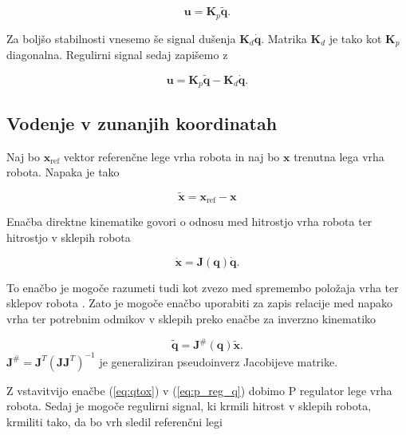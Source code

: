 \documentclass[a4paper]{article}
\begin{document}
\begin{equation} \label{eq:p_reg_q}
\textbf{u} = \textbf{K}_p  \tilde{\textbf{q}}.
\end{equation}


Za boljšo stabilnosti vnesemo še signal dušenja $\textbf{K}_d \dot{\mathbf{q}}$. Matrika $\textbf{K}_d$ je tako kot $\textbf{K}_p$ diagonalna. Regulirni signal sedaj zapišemo z

\begin{equation} \label{eq:pd_reg_q}
\textbf{u} = \textbf{K}_p \tilde{\mathbf{q}} - \textbf{K}_d \dot{\mathbf{q}}.
\end{equation}

\subsection{Vodenje v zunanjih koordinatah} \label{sec:admit_out}

Naj bo $\textbf{x}_{\mathrm{ref}}$ vektor referenčne lege vrha robota in naj bo $\textbf{x}$ trenutna lega vrha robota. Napaka je tako

\begin{equation} \label{eq:xerr}
\tilde{\textbf{x}} = \textbf{x}_{\mathrm{ref}}  - \textbf{x}
\end{equation}

Enačba direktne kinematike govori o odnosu med hitrostjo vrha robota ter hitrostjo v sklepih robota

\begin{equation} \label{eq:qtox}
\dot{\textbf{x}} = \textbf{J}(\textbf{q})  \dot{\textbf{q}}.
\end{equation}

To enačbo je mogoče razumeti tudi kot zvezo med spremembo položaja vrha ter sklepov robota \cite{mihelj_vodenje}. Zato je mogoče enačbo uporabiti za zapis relacije med napako vrha ter potrebnim odmikov v sklepih preko enačbe za inverzno kinematiko

\begin{equation} \label{eq:qerr}
\tilde{\textbf{q}} = \textbf{J}^{\#}(\textbf{q})  \tilde{\textbf{x}}.
\end{equation}
$\mathbf{J}^{\#} =  \mathbf{J}^{T} (\mathbf{J} \mathbf{J}^T)^{-1}$ je generaliziran pseudoinverz Jacobijeve matrike.

Z vstavitvijo enačbe (\ref{eq:qtox}) v (\ref{eq:p_reg_q}) dobimo P regulator lege vrha robota. Sedaj je mogoče regulirni signal, ki krmili hitrost v sklepih robota, krmiliti tako, da bo vrh sledil referenčni legi
\end{document}

